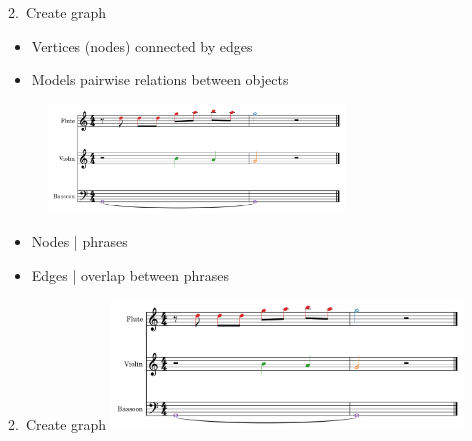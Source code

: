 \documentclass[handout]{beamer}
\begin{document}
\begin{frame}{2.\ Create graph}

    \begin{itemize}
        \item Vertices (nodes) connected by edges
        \item Models pairwise relations between objects
    \end{itemize}

    \begin{figure}
        \includegraphics[width=0.7\textwidth]{../Figures/toy-1.png}
    \end{figure}

    \begin{itemize}
        \item Nodes | phrases
        \item Edges | overlap between phrases
    \end{itemize}

\end{frame}

\begin{frame}{2.\ Create graph}
    \centering
    \includegraphics[width=0.7\textwidth]{../Figures/toy-1.png}
    \scalebox{.8}{}
\end{frame}
\end{document}
